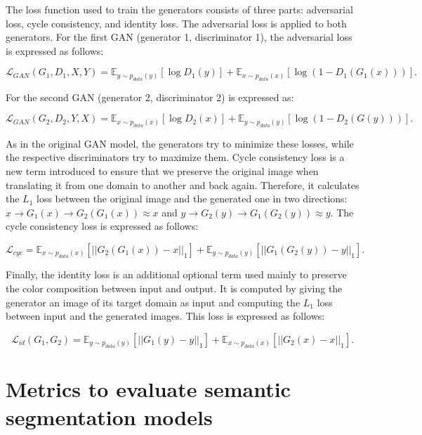 The loss function used to train the generators consists of three parts: adversarial loss, cycle consistency, and identity loss. The adversarial loss  is applied to both generators. For the first \ac{GAN} (generator 1, discriminator 1), the adversarial loss is expressed as follows:

\begin{equation} \mathcal{L}_{ GAN }(G_1,D_1,X,Y)=\mathbb{E}_{y\sim p_{data}(y)}[\log{D_1(y)}]+\mathbb{E}_{x\sim p_{data}(x)}[\log{(1-D_1(G_1(x)))}]. 
\end{equation} 

For the second \ac{GAN} (generator 2, discriminator 2) is expressed as:

\begin{equation} \mathcal{L}_{ GAN }(G_2,D_2,Y,X)=\mathbb{E}_{x\sim p_{data}(x)}[\log{D_2(x)}]+\mathbb{E}_{y\sim p_{data}(y)}[\log{(1-D_2(G(y)))}]. 
\end{equation}
 
As in the original \ac{GAN} model, the generators try to minimize these losses, while the respective discriminators try to maximize them. Cycle consistency loss is a new term introduced to ensure that we preserve the original image when translating it from one domain to another and back again. Therefore, it calculates the $L_1$ loss between the original image and the generated one in two directions: $x \rightarrow G_1(x) \rightarrow G_2(G_1(x)) \approx x$ and $y \rightarrow G_2(y) \rightarrow G_1(G_2(y)) \approx y$. The cycle consistency loss is expressed as follows:

\begin{equation} 
\mathcal{L}_{cyc} = \mathbb{E}_{x\sim p_{data}(x)} [||G_{2}(G_{1}(x))-x||_1] + \mathbb{E}_{y\sim p_{data}(y)} [||G_{1}(G_{2}(y))-y||_1].
\label{eq:CCL}
\end{equation}

Finally, the identity loss is an additional optional term used mainly to preserve the color composition between input and output. It is computed by giving the generator an image of its target domain as input and computing the $L_1$ loss between input and the generated images. This loss is expressed as follows:

\begin{equation} 
\mathcal{L}_{id}(G_1,G_2) = \mathbb{E}_{y\sim p_{data}(y)} [||G_{1}(y)-y||_1] + \mathbb{E}_{x\sim p_{data}(x)} [||G_{2}(x)-x||_1].
\label{eq:identity}
\end{equation}

\section{Metrics to evaluate semantic segmentation models}

